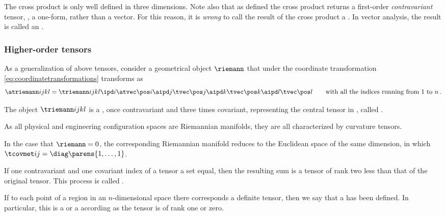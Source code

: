\begin{remark}
  The cross product is only well defined in three dimensions. Note also that as defined the cross product returns a first-order \emph{contravariant} tensor, \ie, a one-form, rather than a vector. For this reason, it is \emph{wrong} to call the result of the cross product a . In vector analysis, the result is called an .
\end{remark}


\subsubsection{Higher-order tensors}

As a generalization of above tensors, consider a geometrical object $\riemann$ that under the coordinate transformation \cref{eq:coordinatetransformations} transforms as
%
\begin{equation}
  \atriemann ijkl = \triemann ijkl\ipd i\atvec\pos i\aipd j\tvec\pos j\aipd k\tvec\pos k\aipd l\tvec\pos l 
    \qquad\text{with all the indices running from $1$ to $n$}\,.
\end{equation}
%
\begin{definition}
  The object $\triemann ijkl$ is a , once contravariant and three times covariant, representing the central tensor in , called .
\end{definition}

As all physical and engineering configuration spaces are Riemannian manifolds, they are all characterized by curvature tensors. 

In the case that $\riemann = 0$, the corresponding Riemannian manifold reduces to the Euclidean space of the same dimension, in which $\tcovmet ij = \diag\parens{1,\dotsc,1}$.

\begin{definition}
  If one contravariant and one covariant index of a tensor a set equal, then the resulting sum is a tensor of rank two less than that of the original tensor. This process is called .
\end{definition}

\begin{definition}
  If to each point of a region in an $n$-dimensional space there corresponds a definite tensor, then we say that a  has been defined. In particular, this is a  or a  according as the tensor is of rank one or zero.
\end{definition}

